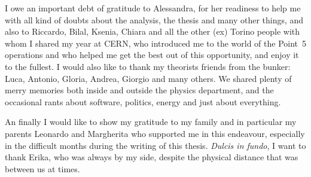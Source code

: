 I owe an important debt of gratitude to
Alessandra, for her readiness to help me with all kind of doubts about the analysis, the thesis and many other things, and also to
Riccardo, Bilal, Ksenia, Chiara and all the other (ex) Torino people with whom I shared my year at CERN,
who introduced me to the world of the Point~5 operations and
who helped me get the best out of this opportunity, and enjoy it to the fullest.
I would also like to thank my theorists friends from the bunker:
Luca, Antonio, Gloria, Andrea, Giorgio and many others.
We shared plenty of merry memories both inside and outside the physics department,
and the occasional rants about software, politics, energy and just about everything.


An finally I would like to show my gratitude to my family and in particular
my parents Leonardo and Margherita who supported me in this endeavour, especially in the difficult months during the writing of this thesis.
\textit{Dulcis in fundo}, I want to thank
Erika, who was always by my side, despite the physical distance that was between us at times.
